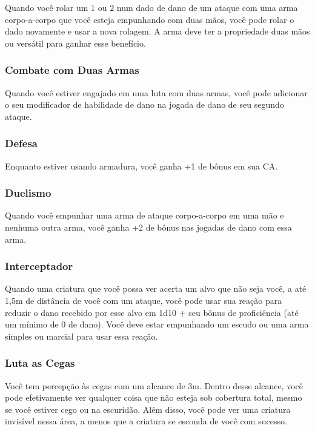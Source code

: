 \documentclass{RPG_Adventure}[2021/10/20]
\begin{document}
Quando você rolar um $1$ ou $2$ num dado de dano de um ataque com uma arma
corpo-a-corpo que você esteja empunhando com duas mãos, você pode rolar o dado
novamente e usar a nova rolagem. A arma deve ter a propriedade duas mãos ou
versátil para ganhar esse benefício.

\subsubsection{Combate com Duas Armas}%

Quando você estiver engajado em uma luta com duas armas, você pode adicionar o
seu modificador de habilidade de dano na jogada de dano de seu segundo ataque.

\subsubsection{Defesa}%

Enquanto estiver usando armadura, você ganha +1 de bônus em sua CA.

\subsubsection{Duelismo}%

Quando você empunhar uma arma de ataque corpo-a-corpo em uma mão e nenhuma outra
arma, você ganha +2 de bônus nas jogadas de dano com essa arma.

\subsubsection{Interceptador}%

Quando uma criatura que você possa ver acerta um alvo que não seja você, a até
1,5m de distância de você com um ataque, você pode usar sua reação para reduzir
o dano recebido por esse alvo em 1d10 + seu bônus de proficiência (até um mínimo
de 0 de dano). Você deve estar empunhando um escudo ou uma arma simples ou
marcial para usar essa reação.

\subsubsection{Luta as Cegas}%

Você tem percepção às cegas com um alcance de 3m. Dentro desse alcance, você
pode efetivamente ver qualquer coisa que não esteja sob cobertura total, mesmo
se você estiver cego ou na escuridão. Além disso, você pode ver uma criatura
invisível nessa área, a menos que a criatura se esconda de você com sucesso.
\end{document}
